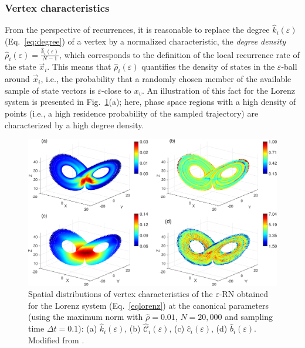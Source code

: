 			\subsubsection{Vertex characteristics}
        			From the perspective of recurrences, it is reasonable to replace the degree $\hat{k}_i(\varepsilon)$ (Eq.~\ref{eq:degree}) of a vertex by a normalized characteristic, the \textit{degree density} $\hat{\rho}_i(\varepsilon) =\frac{\hat{k}_i(\varepsilon)}{N-1}$, which corresponds to the definition of the local recurrence rate of the state $\vec{x}_i$. This means that $\hat{\rho}_i(\varepsilon)$ quantifies the density of states in the $\varepsilon$-ball around $\vec{x}_i$, i.e., the probability that a randomly chosen member of the available sample of state vectors is $\varepsilon$-close to $x_v$. An illustration of this fact for the Lorenz system is presented in Fig.~\ref{fig:local}(a); here, phase space regions with a high density of points (i.e., a high residence probability of the sampled trajectory) are characterized by a high degree density.
\begin{figure}
	\centering
	\includegraphics[width=\columnwidth]{Chapter03_RecurrenceNt/phase_deg_cc_cls_btwLoenz.eps}
\caption{Spatial distributions of vertex characteristics of the $\varepsilon$-RN obtained for the Lorenz system (Eq.~\ref{eqlorenz}) at the canonical parameters (using the maximum norm with $\hat{\rho}=0.01$, $N=20,000$ and sampling time $\Delta t=0.1$): (a) $\hat{k}_i(\varepsilon)$, (b) $\hat{\mathcal{C}}_i(\varepsilon)$, (c) $\hat{c}_i(\varepsilon)$, (d) $\hat{b}_i(\varepsilon)$. Modified from \cite{Donner2010a}. } \label{fig:local}
\end{figure}

